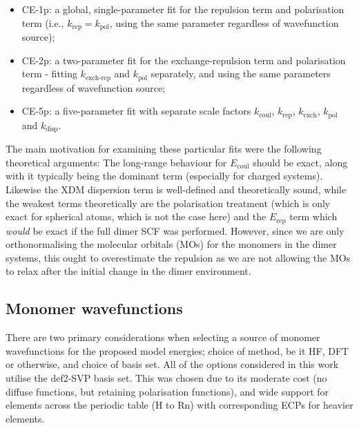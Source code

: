 \documentclass[preprint]{iucr}              %
\begin{document}
\begin{itemize}
    \item CE-1p: a global, single-parameter fit for the repulsion
term and polarisation term (i.e., $k_\text{rep} = k_\text{pol}$, using the same parameter regardless of wavefunction source);
    \item CE-2p: a two-parameter fit for the exchange-repulsion term and polarisation term - fitting $k_\text{exch-rep}$ and $k_\text{pol}$ separately, and using the same parameters regardless of wavefunction source;
    \item CE-5p: a five-parameter fit with separate scale factors $k_\text{coul}$,
$k_\text{rep}$, $k_\text{exch}$, $k_\text{pol}$ and $k_\text{disp}$. 
\end{itemize}

The main motivation for examining these particular fits were the following theoretical arguments: The long-range behaviour for $E_\text{coul}$ 
should be exact, along with it typically being the dominant term (especially for charged systems). Likewise the XDM dispersion term is well-defined and theoretically sound, while the weakest terms theoretically are the polarisation treatment (which is only exact for spherical atoms,
which is not the case here) and the $E_\text{rep}$ term which \emph{would} be exact if the full dimer SCF was performed. However, since we are only
orthonormalising the molecular orbitals (MOs) for the monomers in the dimer systems, this ought to overestimate the repulsion as we are not allowing the MOs to relax after the initial change in the dimer environment.

\subsection{Monomer wavefunctions}

There are two primary considerations when selecting a source of monomer wavefunctions for the proposed model energies; choice of method, be it HF, DFT or otherwise, and choice of basis set.
All of the options considered in this work utilise the def2-SVP \cite{Weigend2005} 
basis set. This was chosen due to its moderate cost (no diffuse functions, but retaining polarisation functions), 
and wide support for elements across the periodic table (H to Rn) with corresponding ECPs \cite{Peterson2003} for heavier elements.
\end{document}

